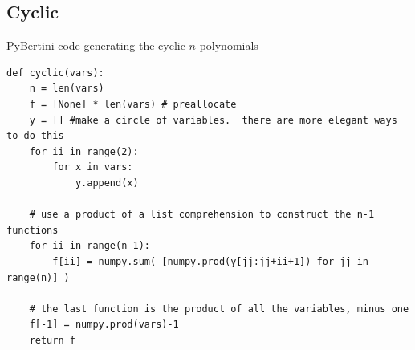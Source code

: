 \documentclass[letter,portrait]{article}
\newcommand{\1}{{\tt \_1}}
\newcommand{\2}{{\tt \_2}}
\begin{document}
\subsection{Cyclic}

PyBertini code generating the cyclic-$n$ polynomials

\label{app:cyclic}
\begin{verbatim}
def cyclic(vars):
    n = len(vars)
    f = [None] * len(vars) # preallocate
    y = [] #make a circle of variables.  there are more elegant ways to do this
    for ii in range(2):
        for x in vars:
            y.append(x)

    # use a product of a list comprehension to construct the n-1 functions
    for ii in range(n-1):
        f[ii] = numpy.sum( [numpy.prod(y[jj:jj+ii+1]) for jj in range(n)] )

    # the last function is the product of all the variables, minus one
    f[-1] = numpy.prod(vars)-1
    return f

\end{verbatim}









\clearpage











\end{document}

